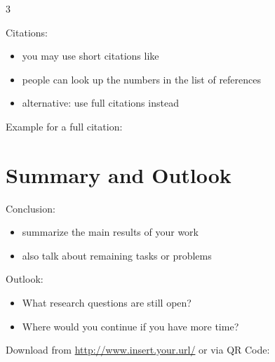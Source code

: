 \documentclass[portrait,20pt]{sciposter}
\begin{document}
\begin{multicols}{3}
\begin{block}{Citations:}
	\begin{itemize}
		\item you may use short citations like~\cite{grossman:chicago_manual}
		\item people can look up the numbers in the list of references
		\item alternative: use full citations instead
	\end{itemize}
\end{block}
\begin{block}{Example for a full citation:}
	\small{}
\end{block}

\section{Summary and Outlook}

\begin{block}{Conclusion:}
	\begin{itemize}
		\item summarize the main results of your work
		\item also talk about remaining tasks or problems	  	
	\end{itemize}
\end{block}

\begin{block}{Outlook:}
	\begin{itemize}
		\item What research questions are still open?
		\item Where would you continue if you have more time?
	\end{itemize}
\end{block}	

\begin{block}{Download from \url{http://www.insert.your.url/} or via QR Code:}
	\begin{center}
	\end{center}
\end{block}

\end{multicols}

\printbibliography
\end{document}
